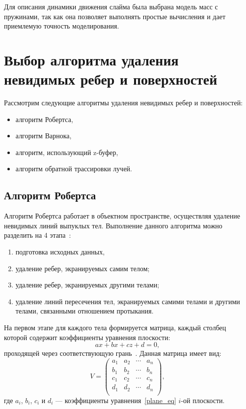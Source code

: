 Для описания динамики движения слайма была выбрана модель масс с
пружинами, так как она позволяет выполнять простые вычисления и дает
приемлемую точность моделирования.

\section{Выбор алгоритма удаления невидимых ребер и поверхностей}

Рассмотрим следующие алгоритмы удаления невидимых ребер и поверхностей:

\begin{itemize}
	\item алгоритм Робертса,
	\item алгоритм Варнока,
	\item алгоритм, использующий z-буфер,
	\item алгоритм обратной трассировки лучей.
\end{itemize}

\subsection{Алгоритм Робертса}

Алгоритм Робертса работает в объектном пространстве, осуществляя
удаление невидимых линий выпуклых тел. Выполнение данного алгоритма можно
разделить на 4 этапа~\cite{rojers}:

\begin{enumerate}
	\item подготовка исходных данных,
	\item удаление ребер, экранируемых самим телом;
	\item удаление ребер, экранируемых другими телами;
	\item удаление линий пересечения тел, экранируемых самими телами и другими телами, связанными отношением протыкания.
\end{enumerate}

На первом этапе для каждого тела формируется матрица, каждый столбец
которой содержит коэффициенты уравнения плоскости:
\begin{equation}\label{plane_eq}
	ax + bx + cz + d = 0,
\end{equation}
проходящей через соответствующую грань~\cite{rojers}. Данная матрица имеет вид:
$$
V =
\begin{pmatrix}
	a_1 & a_2 & \cdots & a_n \\
	b_1 & b_2 & \cdots & b_n \\
	c_1 & c_2 & \cdots & c_n \\
	d_1 & d_2 & \cdots & d_n \\
\end{pmatrix},
$$
где $a_i$, $b_i$, $c_i$ и $d_i$ --- коэффициенты уравнения~\eqref{plane_eq} $i$-ой плоскости.

